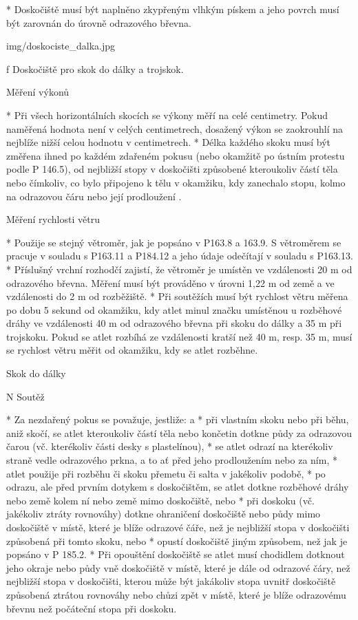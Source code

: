 * Doskočiště musí být naplněno zkypřeným vlhkým pískem a jeho povrch musí být zarovnán do úrovně odrazového břevna.

\picw=8cm \inspic img/doskociste_dalka.jpg
\caption/f Doskočiště pro skok do dálky a trojskok.

Měření výkonů

* Při všech horizontálních skocích se výkony měří na celé centimetry. Pokud naměřená hodnota není v celých centimetrech, dosažený výkon se zaokrouhlí na nejblíže nižší celou hodnotu v centimetrech.
* Délka každého skoku musí být změřena ihned po každém zdařeném pokusu (nebo okamžitě po ústním protestu podle P 146.5), od nejbližší stopy v doskočišti způsobené kteroukoliv částí těla nebo čímkoliv, co bylo připojeno k tělu v okamžiku, kdy zanechalo stopu, kolmo na odrazovou čáru nebo její prodloužení .

Měření rychlosti větru

* Použije se stejný větroměr, jak je popsáno v P163.8 a 163.9. S větroměrem se pracuje v souladu s P163.11 a P184.12 a jeho údaje odečítají v souladu s P163.13.
* Příslušný vrchní rozhodčí zajistí, že větroměr je umístěn ve vzdálenosti 20 m od odrazového břevna. Měření musí být prováděno v úrovni 1,22 m od země a ve vzdálenosti do 2 m od rozběžiště.
* Při soutěžích musí být rychlost větru měřena po dobu 5 sekund od okamžiku, kdy atlet minul značku umístěnou u rozběhové dráhy ve vzdálenosti 40 m od odrazového břevna při skoku do dálky a 35 m při trojskoku. Pokud se atlet rozbíhá ze vzdálenosti kratší než 40 m, resp. 35 m, musí se rychlost větru měřit od okamžiku, kdy se atlet rozběhne.
\enditems

\secc Skok do dálky

\begitems \style N
Soutěž

* Za nezdařený pokus se považuje, jestliže:
  \begitems \style a
  * při vlastním skoku nebo při běhu, aniž skočí, se atlet kteroukoliv částí těla nebo končetin dotkne půdy za odrazovou čarou (vč. kterékoliv části desky s plastelínou),
  * se atlet odrazí na kterékoliv straně vedle odrazového prkna, a to ať před jeho prodloužením nebo za ním,
  * atlet použije při rozběhu či skoku přemetu či salta v jakékoliv podobě,
  * po odrazu, ale před prvním dotykem s doskočištěm, se atlet dotkne rozběhové dráhy nebo země kolem ní nebo země mimo doskočiště, nebo
  * při doskoku (vč. jakékoliv ztráty rovnováhy) dotkne ohraničení doskočiště nebo půdy mimo doskočiště v místě, které je blíže odrazové čáře, než je nejbližší stopa v doskočišti způsobená při tomto skoku, nebo
  * opustí doskočiště jiným způsobem, než jak je popsáno v P 185.2.
  \enditems
* Při opouštění doskočiště se atlet musí chodidlem dotknout jeho okraje nebo půdy vně doskočiště v místě, které je dále od odrazové čáry, než nejbližší stopa v doskočišti, kterou může být jakákoliv stopa uvnitř doskočiště způsobená ztrátou rovnováhy nebo chůzi zpět v místě, které je blíže odrazovému břevnu než počáteční stopa při doskoku.

